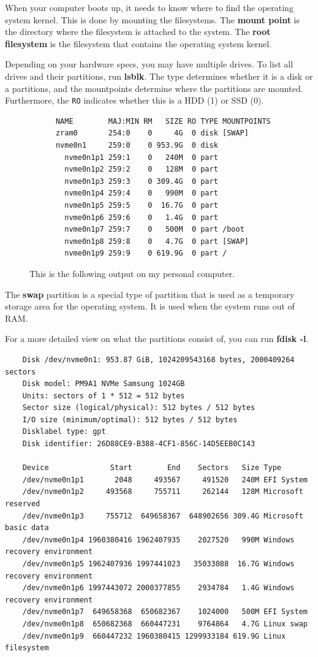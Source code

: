 \documentclass{article}
\begin{document}
  When your computer boots up, it needs to know where to find the operating system kernel. This is done by mounting the filesystems. The \textbf{mount point} is the directory where the filesystem is attached to the system. The \textbf{root filesystem} is the filesystem that contains the operating system kernel.

  Depending on your hardware specs, you may have multiple drives. To list all drives and their partitions, run \textbf{lsblk}. The type determines whether it is a disk or a partitions, and the mountpoints determine where the partitions are mounted. Furthermore, the \texttt{RO} indicates whether this is a HDD (1) or SSD (0). 

  \begin{figure}[hbt!]
    \centering 
    \begin{lstlisting} 
      NAME        MAJ:MIN RM   SIZE RO TYPE MOUNTPOINTS
      zram0       254:0    0     4G  0 disk [SWAP]
      nvme0n1     259:0    0 953.9G  0 disk 
        nvme0n1p1 259:1    0   240M  0 part 
        nvme0n1p2 259:2    0   128M  0 part 
        nvme0n1p3 259:3    0 309.4G  0 part 
        nvme0n1p4 259:4    0   990M  0 part 
        nvme0n1p5 259:5    0  16.7G  0 part 
        nvme0n1p6 259:6    0   1.4G  0 part 
        nvme0n1p7 259:7    0   500M  0 part /boot
        nvme0n1p8 259:8    0   4.7G  0 part [SWAP]
        nvme0n1p9 259:9    0 619.9G  0 part /
    \end{lstlisting}
    \caption{This is the following output on my personal computer. } 
    \label{fig:lsblk}
  \end{figure}
    
  The \textbf{swap} partition is a special type of partition that is used as a temporary storage area for the operating system. It is used when the system runs out of RAM. 

  For a more detailed view on what the partitions consist of, you can run \textbf{fdisk -l}.
  \begin{lstlisting} 
    Disk /dev/nvme0n1: 953.87 GiB, 1024209543168 bytes, 2000409264 sectors
    Disk model: PM9A1 NVMe Samsung 1024GB               
    Units: sectors of 1 * 512 = 512 bytes
    Sector size (logical/physical): 512 bytes / 512 bytes
    I/O size (minimum/optimal): 512 bytes / 512 bytes
    Disklabel type: gpt
    Disk identifier: 26D88CE9-B388-4CF1-856C-14D5EEB0C143

    Device              Start        End    Sectors   Size Type
    /dev/nvme0n1p1       2048     493567     491520   240M EFI System
    /dev/nvme0n1p2     493568     755711     262144   128M Microsoft reserved
    /dev/nvme0n1p3     755712  649658367  648902656 309.4G Microsoft basic data
    /dev/nvme0n1p4 1960380416 1962407935    2027520   990M Windows recovery environment
    /dev/nvme0n1p5 1962407936 1997441023   35033088  16.7G Windows recovery environment
    /dev/nvme0n1p6 1997443072 2000377855    2934784   1.4G Windows recovery environment
    /dev/nvme0n1p7  649658368  650682367    1024000   500M EFI System
    /dev/nvme0n1p8  650682368  660447231    9764864   4.7G Linux swap
    /dev/nvme0n1p9  660447232 1960380415 1299933184 619.9G Linux filesystem
  \end{lstlisting}
\end{document}
